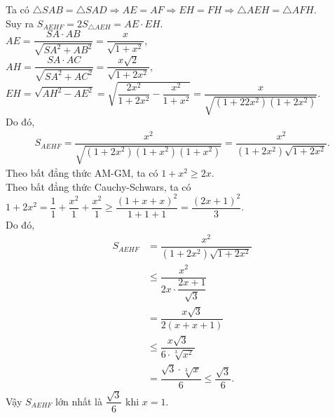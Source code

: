 \begin{ex}
{		Ta có  $\triangle SAB=\triangle SAD\Rightarrow AE=AF\Rightarrow EH=FH\Rightarrow\triangle AEH=\triangle AFH$.\\
		Suy ra $S_{AEHF}=2S_{\triangle  AEH}=AE\cdot EH$.\\
		$AE=\dfrac{SA\cdot AB}{\sqrt{SA^2+AB^2}}=\dfrac{x}{\sqrt{1+x^2}}$,\\ 
		 $AH=\dfrac{SA\cdot AC}{\sqrt{SA^2+AC^2}}=\dfrac{x\sqrt{2}}{\sqrt{1+2 x^2}}$,\\
		$EH=\sqrt{AH^2-AE^2}=\sqrt{\dfrac{2  x^2}{1+2 x^2}-\dfrac{x^2}{1+x^2}}=\dfrac{x}{\sqrt{\left(1+2 2x^2\right)\left(1+2 x^2\right)}}$.\\
		Do đó,\allowdisplaybreaks 
		\begin{align*}
			 S_{AEHF}=\dfrac{x^2}{\sqrt{\left(1+2 x^2\right)\left(1+x^2\right)\left(1+x^2\right)}}
			=\dfrac{x^2}{\left(1+2 x^2\right)\sqrt{1+2  x^2}}.
		\end{align*}
		Theo  bất đẳng thức AM-GM, ta có $1+x^2\geq 2x$.\\
		 Theo bất đẳng thức Cauchy-Schwars, ta có $1+2x^2=\dfrac{1}{1}+\dfrac{x^2}{1}+\dfrac{x^2}{1}\geq\dfrac{(1+x+x)^2}{1+1+1}=\dfrac{(2x+1)^2}{3}$.\\
		 Do đó,
		\begin{align*}
			 S_{AEHF}&=\dfrac{x^2}{\left(1+2 x^2\right)\sqrt{1+2 x^2}}\\
			&\le\dfrac{x^2}{2x\cdot \dfrac{2x+1}{\sqrt{3}}}\\ 
			&=\dfrac{x\sqrt{3}}{2(x+x+1)}\\ 
			&\le\dfrac{x\sqrt{3}}{6\cdot  \sqrt[3]{x^2}}\\
			&=\dfrac{\sqrt{3}\cdot  \sqrt[3]{x}}{6}\le\dfrac{\sqrt{3}}{6}.
		\end{align*}
		Vậy $S_{AEHF}$ lớn nhất là $\dfrac{\sqrt{3}}{6}$  khi $x=1$.
	} 
\end{ex}

